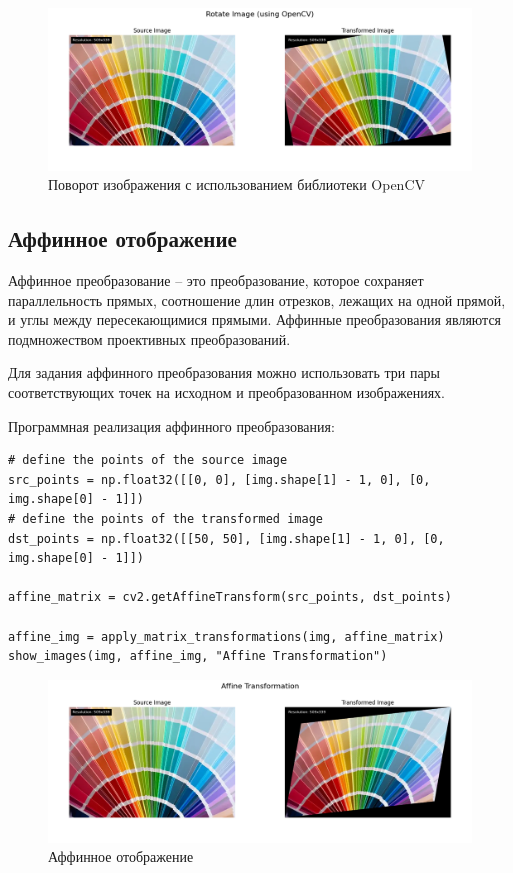 \begin{figure}[ht]
    \includegraphics[width=\textwidth]{../results/Rotate Image (using OpenCV).png}
    \caption{Поворот изображения с использованием библиотеки OpenCV}
    \label{fig:rotate_image_cv}
\end{figure}

\subsection{Аффинное отображение} 

Аффинное преобразование -- это преобразование, которое сохраняет параллельность прямых, соотношение длин отрезков, лежащих на одной прямой, и углы между пересекающимися прямыми.
Аффинные преобразования являются подмножеством проективных преобразований. 

Для задания аффинного преобразования можно использовать три пары соответствующих точек на исходном и преобразованном изображениях.

Программная реализация аффинного преобразования:
\begin{lstlisting}[style=python_white, caption={Исходный код для аффинного отображения}]
# define the points of the source image
src_points = np.float32([[0, 0], [img.shape[1] - 1, 0], [0, img.shape[0] - 1]])
# define the points of the transformed image
dst_points = np.float32([[50, 50], [img.shape[1] - 1, 0], [0, img.shape[0] - 1]])

affine_matrix = cv2.getAffineTransform(src_points, dst_points)

affine_img = apply_matrix_transformations(img, affine_matrix)
show_images(img, affine_img, "Affine Transformation")
\end{lstlisting}

\begin{figure}[ht]
    \includegraphics[width=\textwidth]{../results/Affine Transformation.png}
    \caption{Аффинное отображение}
    \label{fig:affine_image}
\end{figure}

